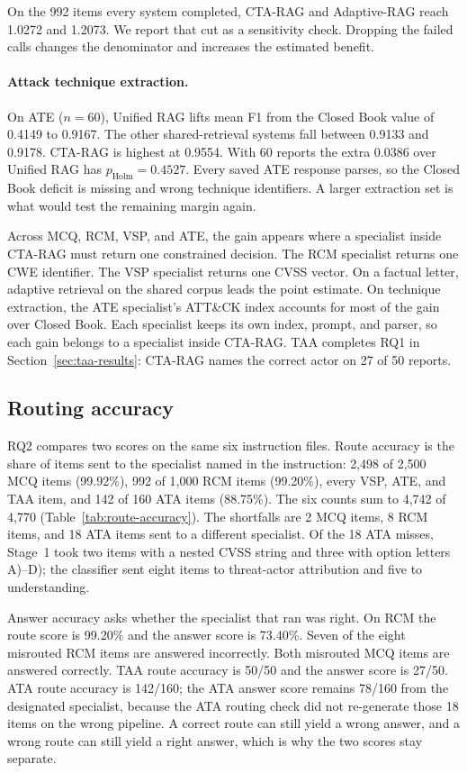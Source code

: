 \documentclass[5p,times,authoryear]{elsarticle}
\begin{document}
On the 992 items every system completed, CTA-RAG and Adaptive-RAG reach 1.0272 and 1.2073. We report that cut as a sensitivity check. Dropping the failed calls changes the denominator and increases the estimated benefit.

\paragraph{Attack technique extraction.}
On ATE ($n{=}60$), Unified RAG lifts mean F1 from the Closed Book value of 0.4149 to 0.9167. The other shared-retrieval systems fall between 0.9133 and 0.9178. CTA-RAG is highest at 0.9554. With 60 reports the extra 0.0386 over Unified RAG has $p_{\mathrm{Holm}}{=}0.4527$. Every saved ATE response parses, so the Closed Book deficit is missing and wrong technique identifiers. A larger extraction set is what would test the remaining margin again.

Across MCQ, RCM, VSP, and ATE, the gain appears where a specialist inside CTA-RAG must return one constrained decision. The RCM specialist returns one CWE identifier. The VSP specialist returns one CVSS vector. On a factual letter, adaptive retrieval on the shared corpus leads the point estimate. On technique extraction, the ATE specialist's ATT\&CK index accounts for most of the gain over Closed Book. Each specialist keeps its own index, prompt, and parser, so each gain belongs to a specialist inside CTA-RAG. TAA completes RQ1 in Section~\ref{sec:taa-results}: CTA-RAG names the correct actor on 27 of 50 reports.

\subsection{Routing accuracy}
\label{sec:robustness}

RQ2 compares two scores on the same six instruction files. Route accuracy is the share of items sent to the specialist named in the instruction: 2,498 of 2,500 MCQ items (99.92\%), 992 of 1,000 RCM items (99.20\%), every VSP, ATE, and TAA item, and 142 of 160 ATA items (88.75\%). The six counts sum to 4,742 of 4,770 (Table~\ref{tab:route-accuracy}). The shortfalls are 2 MCQ items, 8 RCM items, and 18 ATA items sent to a different specialist. Of the 18 ATA misses, Stage~1 took two items with a nested CVSS string and three with option letters A)--D); the classifier sent eight items to threat-actor attribution and five to understanding.

Answer accuracy asks whether the specialist that ran was right. On RCM the route score is 99.20\% and the answer score is 73.40\%. Seven of the eight misrouted RCM items are answered incorrectly. Both misrouted MCQ items are answered correctly. TAA route accuracy is 50/50 and the answer score is 27/50. ATA route accuracy is 142/160; the ATA answer score remains 78/160 from the designated specialist, because the ATA routing check did not re-generate those 18 items on the wrong pipeline. A correct route can still yield a wrong answer, and a wrong route can still yield a right answer, which is why the two scores stay separate.
\end{document}
